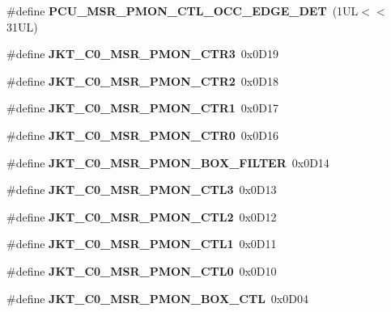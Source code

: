 \begin{DoxyCompactItemize}
\item 
\#define {\bfseries P\+C\+U\+\_\+\+M\+S\+R\+\_\+\+P\+M\+O\+N\+\_\+\+C\+T\+L\+\_\+\+O\+C\+C\+\_\+\+E\+D\+G\+E\+\_\+\+D\+ET}~(1\+U\+L$<$$<$31\+U\+L)\label{types_8h_a45022ec8dc8fcc09dfccc717e33f130d}

\item 
\#define {\bfseries J\+K\+T\+\_\+\+C0\+\_\+\+M\+S\+R\+\_\+\+P\+M\+O\+N\+\_\+\+C\+T\+R3}~0x0\+D19\label{types_8h_af453401af8ac44f2b383415605c8426b}

\item 
\#define {\bfseries J\+K\+T\+\_\+\+C0\+\_\+\+M\+S\+R\+\_\+\+P\+M\+O\+N\+\_\+\+C\+T\+R2}~0x0\+D18\label{types_8h_a1e1ffc38f7039a2fcebbda3f9b5e0cac}

\item 
\#define {\bfseries J\+K\+T\+\_\+\+C0\+\_\+\+M\+S\+R\+\_\+\+P\+M\+O\+N\+\_\+\+C\+T\+R1}~0x0\+D17\label{types_8h_a9846f58878f2706b514a1132eed4b044}

\item 
\#define {\bfseries J\+K\+T\+\_\+\+C0\+\_\+\+M\+S\+R\+\_\+\+P\+M\+O\+N\+\_\+\+C\+T\+R0}~0x0\+D16\label{types_8h_adbb2cf699abceb9d7bacab62f2360f49}

\item 
\#define {\bfseries J\+K\+T\+\_\+\+C0\+\_\+\+M\+S\+R\+\_\+\+P\+M\+O\+N\+\_\+\+B\+O\+X\+\_\+\+F\+I\+L\+T\+ER}~0x0\+D14\label{types_8h_a22d14f649a68e2fffc253fb7c7e41e3b}

\item 
\#define {\bfseries J\+K\+T\+\_\+\+C0\+\_\+\+M\+S\+R\+\_\+\+P\+M\+O\+N\+\_\+\+C\+T\+L3}~0x0\+D13\label{types_8h_a9978b68b4c0ca0cafefea351d0079822}

\item 
\#define {\bfseries J\+K\+T\+\_\+\+C0\+\_\+\+M\+S\+R\+\_\+\+P\+M\+O\+N\+\_\+\+C\+T\+L2}~0x0\+D12\label{types_8h_a82ba9dd7fcf01994e85d558b4e481287}

\item 
\#define {\bfseries J\+K\+T\+\_\+\+C0\+\_\+\+M\+S\+R\+\_\+\+P\+M\+O\+N\+\_\+\+C\+T\+L1}~0x0\+D11\label{types_8h_a398a8a31386e9fc47fed63f6bffc2772}

\item 
\#define {\bfseries J\+K\+T\+\_\+\+C0\+\_\+\+M\+S\+R\+\_\+\+P\+M\+O\+N\+\_\+\+C\+T\+L0}~0x0\+D10\label{types_8h_a030002252aacc254548ada78d2c65197}

\item 
\#define {\bfseries J\+K\+T\+\_\+\+C0\+\_\+\+M\+S\+R\+\_\+\+P\+M\+O\+N\+\_\+\+B\+O\+X\+\_\+\+C\+TL}~0x0\+D04\label{types_8h_a26683ece9ba36b917bb745038f1193d3}


\end{DoxyCompactItemize}
